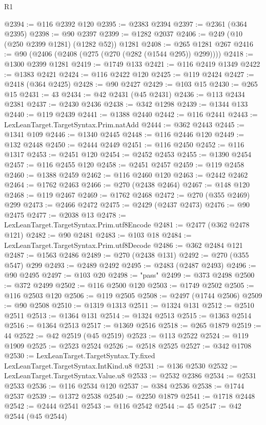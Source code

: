\begin{lexlean}{R1}
\begin{coremodule}
@2394 := @116 @2392 @120
@2395 := @2383 @2394
@2397 := @2361 (@364 @2395)
@2398 := @90 @2397
@2399 := @1282 @2037
@2406 := @249 (@10 (@250 @2399 @1281) (@1282 @52)) @1281
@2408 := @265 @1281 @267
@2416 := @90 (@2406 (@2408 (@275 (@270 (@282 (@1544 @295)) @299))))
@2418 := @1300 @2399 @1281
@2419 := @1749 @133
@2421 := @116 @2419 @1349
@2422 := @1383 @2421
@2424 := @116 @2422 @120
@2425 := @119 @2424
@2427 := @2418 (@364 @2425)
@2428 := @90 @2427
@2429 := @103 @15
@2430 := @265 @15
@2431 := 43
@2434 := @42 @2431 (@45 @2431)
@2436 := @113 @2434 @2381
@2437 := @2430 @2436
@2438 := @342 @1298
@2439 := @1344 @133
@2440 := @119 @2439
@2441 := @1388 @2440
@2442 := @116 @2441
@2443 := LexLeanTarget.TargetSyntax.Prim.natAdd
@2444 := @362 @2443
@2445 := @1341 @109
@2446 := @1340 @2445
@2448 := @116 @2446 @120
@2449 := @132 @2448
@2450 := @2444 @2449
@2451 := @116 @2450
@2452 := @116 @1317
@2453 := @2451 @120
@2454 := @2452 @2453
@2455 := @1390 @2454
@2457 := @116 @2455 @120
@2458 := @2451 @2457
@2459 := @119 @2458
@2460 := @1388 @2459
@2462 := @116 @2460 @120
@2463 := @2442 @2462
@2464 := @1762 @2463
@2466 := @270 (@2438 @2464)
@2467 := @148 @120
@2468 := @119 @2467
@2469 := @1762 @2468
@2472 := @270 (@355 @2469) @299
@2473 := @2466 @2472
@2475 := @2429 (@2437 @2473)
@2476 := @90 @2475
@2477 := @2038 @13
@2478 := LexLeanTarget.TargetSyntax.Prim.utf8Encode
@2481 := @2477 (@362 @2478 @121)
@2482 := @90 @2481
@2483 := @103 @18
@2484 := LexLeanTarget.TargetSyntax.Prim.utf8Decode
@2486 := @362 @2484 @121
@2487 := @1563 @2486
@2489 := @270 (@2438 @131)
@2492 := @270 (@355 @547) @299
@2493 := @2489 @2492
@2495 := @2483 (@2487 @2493)
@2496 := @90 @2495
@2497 := @103 @20
@2498 := "pass"
@2499 := @373 @2498
@2500 := @372 @2499
@2502 := @116 @2500 @120
@2503 := @1749 @2502
@2505 := @116 @2503 @120
@2506 := @119 @2505
@2508 := @2497 (@1744 @2506)
@2509 := @90 @2508
@2510 := @1319 @1313
@2511 := @1324 @131
@2512 := @2510 @2511
@2513 := @1364 @131
@2514 := @1324 @2513
@2515 := @1363 @2514
@2516 := @1364 @2513
@2517 := @1369 @2516
@2518 := @265 @1879
@2519 := 44
@2522 := @42 @2519 (@45 @2519)
@2523 := @113 @2522
@2524 := @119 @1909
@2525 := @2523 @2524
@2526 := @2518 @2525
@2527 := @342 @1708
@2530 := LexLeanTarget.TargetSyntax.Ty.fixed LexLeanTarget.TargetSyntax.IntKind.u8
@2531 := @136 @2530
@2532 := LexLeanTarget.TargetSyntax.Value.u8
@2533 := @2532 @2386
@2534 := @2531 @2533
@2536 := @116 @2534 @120
@2537 := @384 @2536
@2538 := @1744 @2537
@2539 := @1372 @2538
@2540 := @2250 @1879
@2541 := @1718 @2448
@2542 := @2444 @2541
@2543 := @116 @2542
@2544 := 45
@2547 := @42 @2544 (@45 @2544)

\end{coremodule}
\end{lexlean}
